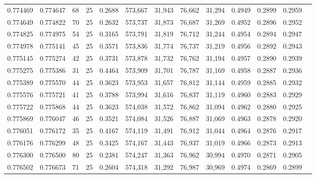 \begin{tabular}{rrrrrrrrrrrrr}
0.774469 & 0.774647 &    68 &  25 &                                     0.2688 & 573,667 &  31,943 &  76,662 &  31,294 & 0.4949 & 0.2899 & 0.2959 \\
0.774649 & 0.774822 &    70 &  25 &                                     0.2632 & 573,737 &  31,873 &  76,687 &  31,269 & 0.4952 & 0.2896 & 0.2952 \\
0.774825 & 0.774975 &    54 &  25 &                                     0.3165 & 573,791 &  31,819 &  76,712 &  31,244 & 0.4954 & 0.2894 & 0.2947 \\
0.774978 & 0.775141 &    45 &  25 &                                     0.3571 & 573,836 &  31,774 &  76,737 &  31,219 & 0.4956 & 0.2892 & 0.2943 \\
0.775145 & 0.775274 &    42 &  25 &                                     0.3731 & 573,878 &  31,732 &  76,762 &  31,194 & 0.4957 & 0.2890 & 0.2939 \\
0.775275 & 0.775386 &    31 &  25 &                                     0.4464 & 573,909 &  31,701 &  76,787 &  31,169 & 0.4958 & 0.2887 & 0.2936 \\
0.775389 & 0.775570 &    44 &  25 &                                     0.3623 & 573,953 &  31,657 &  76,812 &  31,144 & 0.4959 & 0.2885 & 0.2932 \\
0.775576 & 0.775721 &    41 &  25 &                                     0.3788 & 573,994 &  31,616 &  76,837 &  31,119 & 0.4960 & 0.2883 & 0.2929 \\
0.775722 & 0.775868 &    44 &  25 &                                     0.3623 & 574,038 &  31,572 &  76,862 &  31,094 & 0.4962 & 0.2880 & 0.2925 \\
0.775869 & 0.776047 &    46 &  25 &                                     0.3521 & 574,084 &  31,526 &  76,887 &  31,069 & 0.4963 & 0.2878 & 0.2920 \\
0.776051 & 0.776172 &    35 &  25 &                                     0.4167 & 574,119 &  31,491 &  76,912 &  31,044 & 0.4964 & 0.2876 & 0.2917 \\
0.776176 & 0.776299 &    48 &  25 &                                     0.3425 & 574,167 &  31,443 &  76,937 &  31,019 & 0.4966 & 0.2873 & 0.2913 \\
0.776300 & 0.776500 &    80 &  25 &                                     0.2381 & 574,247 &  31,363 &  76,962 &  30,994 & 0.4970 & 0.2871 & 0.2905 \\
0.776502 & 0.776673 &    71 &  25 &                                     0.2604 & 574,318 &  31,292 &  76,987 &  30,969 & 0.4974 & 0.2869 & 0.2899 \\

\end{tabular}
